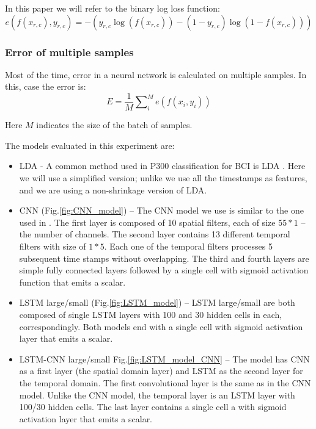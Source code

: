 \documentclass[
12pt, %
english, %
doublespacing, %
headsepline, %
]{MastersDoctoralThesis} %
\begin{document}
In this paper we will refer to the binary log loss function:
\begin{equation}\label{eq:binary_log_loss}
e\left( {f\left( {{x_{r,c}}} \right),{y_{r,c}}} \right) =  - \left( {{y_{r,c}}\log \left( {f\left( {{x_{r,c}}} \right)} \right) - \left( {1 - {y_{r,c}}} \right)\log \left( {1 - f\left( {{x_{r,c}}} \right)} \right)} \right)
\end{equation} 


\subsubsection{Error of multiple samples}
Most of the time, error in a neural network is calculated on multiple samples. In this, case the error is:
\begin{equation}\label{eq:mini_batch_loss}
E = \frac{1}{M}\sum\nolimits_i^M {e\left( {f\left( {{x_i},{y_i}} \right)} \right)}
\end{equation}

Here $M$ indicates the size of the batch of samples.





The models evaluated in this experiment are:
\begin{itemize}
	\item LDA - A common method used in P300 classification for BCI is LDA \cite{BlaknertzExperiment,P300_Tutorial}. Here we will use a simplified version; unlike \cite{BlaknertzExperiment} we use all the timestamps as features, and we are using a non-shrinkage version of LDA.
	
	\item CNN (Fig.\ref{fig:CNN_model}) -- The CNN model we use is similar to the one used in \cite{P300_CNN}. The first layer is composed of 10  spatial filters, each of size $55*1$ -- the number of channels. The second layer contains 13 different temporal filters with size of $1*5$. Each one of the temporal filters processes 5 subsequent time stamps without overlapping. The third and fourth layers are simple fully connected layers followed by a single cell with sigmoid activation function that emits a scalar.
	
	\item LSTM large/small (Fig.\ref{fig:LSTM_model}) -- LSTM large/small are both composed of single LSTM layers with 100 and 30 hidden cells in each, correspondingly. Both models end with a single cell with sigmoid activation layer that emits a scalar.
	
	\item LSTM-CNN large/small Fig.\ref{fig:LSTM_model_CNN} -- The model has CNN as a first layer (the spatial domain layer) and LSTM as the second layer for the temporal domain. The first convolutional layer is the same as in the CNN model. Unlike the CNN model, the temporal layer is an LSTM layer with 100/30 hidden cells. The last layer contains a single cell a with sigmoid activation layer that emits a scalar.

\end{itemize}
\end{document}
